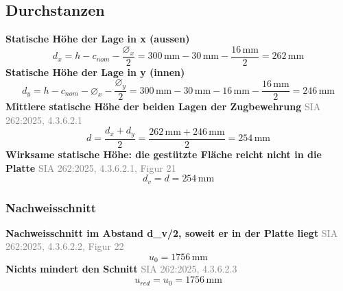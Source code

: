 \documentclass[11pt,a4paper]{article}
\newcommand{\normref}[1]{{\small\textcolor{gray}{#1}}}
\begin{document}
\subsection{Durchstanzen}
\noindent\textbf{Statische Höhe der Lage in x (aussen)}
\begin{equation*}
d_x = h - c_{nom} - \frac{\varnothing_x}{2} = 300\,\mathrm{mm} - 30\,\mathrm{mm} - \frac{16\,\mathrm{mm}}{2} = 262\,\mathrm{mm}
\end{equation*}
\noindent\textbf{Statische Höhe der Lage in y (innen)}
\begin{equation*}
d_y = h - c_{nom} - \varnothing_x - \frac{\varnothing_y}{2} = 300\,\mathrm{mm} - 30\,\mathrm{mm} - 16\,\mathrm{mm} - \frac{16\,\mathrm{mm}}{2} = 246\,\mathrm{mm}
\end{equation*}
\noindent\textbf{Mittlere statische Höhe der beiden Lagen der Zugbewehrung} \hfill \normref{SIA 262:2025, 4.3.6.2.1}
\begin{equation*}
d = \frac{d_x + d_y}{2} = \frac{262\,\mathrm{mm} + 246\,\mathrm{mm}}{2} = 254\,\mathrm{mm}
\end{equation*}
\noindent\textbf{Wirksame statische Höhe: die gestützte Fläche reicht nicht in die Platte} \hfill \normref{SIA 262:2025, 4.3.6.2.1, Figur 21}
\begin{equation*}
d_v = d = 254\,\mathrm{mm}
\end{equation*}
\subsubsection{Nachweisschnitt}
\noindent\textbf{Nachweisschnitt im Abstand d\_v/2, soweit er in der Platte liegt} \hfill \normref{SIA 262:2025, 4.3.6.2.2, Figur 22}
\begin{equation*}
u_0 = 1756\,\mathrm{mm}
\end{equation*}
\noindent\textbf{Nichts mindert den Schnitt} \hfill \normref{SIA 262:2025, 4.3.6.2.3}
\begin{equation*}
u_{red} = u_0 = 1756\,\mathrm{mm}
\end{equation*}
\end{document}

